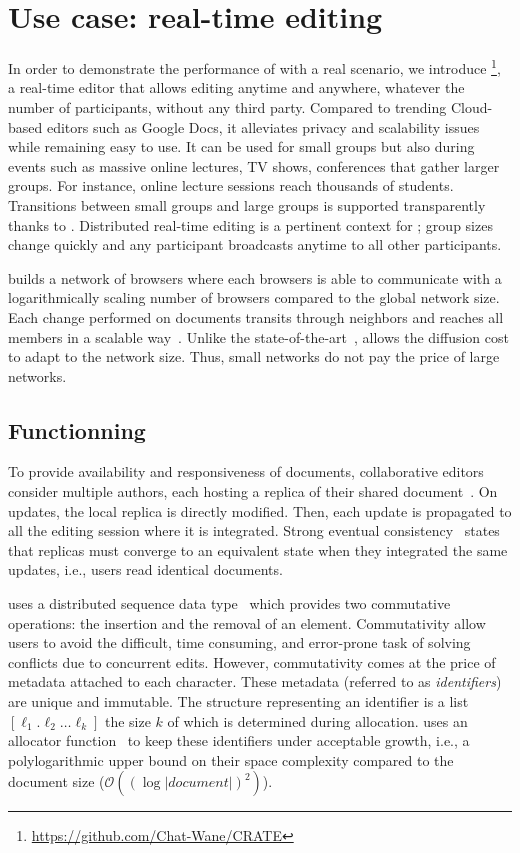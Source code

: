 
\section{Use case: real-time editing}
\label{sec:use-case}

In order to demonstrate the performance of \SPRAY with a real scenario, we
introduce \CRATE\footnote{\url{https://github.com/Chat-Wane/CRATE}}, a
real-time editor that allows editing anytime and anywhere, whatever the number
of participants, without any third party. Compared to trending Cloud-based
editors such as Google Docs, it alleviates privacy and scalability issues while
remaining easy to use.  It can be used for small groups but also during events
such as massive online lectures, TV shows, conferences that gather larger
groups. For instance, online lecture sessions reach thousands of
students. Transitions between small groups and large groups is supported
transparently thanks to \SPRAY. Distributed real-time editing is a pertinent
context for \SPRAY; group sizes change quickly and any participant broadcasts
anytime to all other participants.

\CRATE builds a network of browsers where each browsers is able to communicate
with a logarithmically scaling number of browsers compared to the global network
size. Each change performed on documents transits through neighbors and reaches
all members in a scalable way~\cite{birman1999bimodal}. Unlike the
state-of-the-art~\cite{tolgyeski2009adaptive, voulgaris2005cyclon}, \SPRAY
allows the diffusion cost to adapt to the network size. Thus, small networks do
not pay the price of large networks.

\subsection{Functionning}

To provide availability and responsiveness of documents, collaborative editors
consider multiple authors, each hosting a replica of their shared
document~\cite{saito2005optimistic}.  On updates, the local replica is directly
modified. Then, each update is propagated to all the editing session where it is
integrated. Strong eventual consistency~\cite{bailis2013eventual} states that
replicas must converge to an equivalent state when they integrated the same
updates, i.e., users read identical documents.

\CRATE uses a distributed sequence data type~\cite{shapiro2011conflict} which
provides two commutative operations: the insertion and the removal of an
element. Commutativity allow users to avoid the difficult, time consuming, and
error-prone task of solving conflicts due to concurrent edits. However,
commutativity comes at the price of metadata attached to each character. These
metadata (referred to as \emph{identifiers}) are unique and immutable. The
structure representing an identifier is a list $[\ell_1.\ell_2\ldots\ell_k]$ the
size $k$ of which is determined during allocation. \CRATE uses an allocator
function~\cite{nedelec2013lseq} to keep these identifiers under acceptable
growth, i.e., a polylogarithmic upper bound on their space complexity compared
to the document size ($\mathcal{O}((\log |document|)^2)$).

